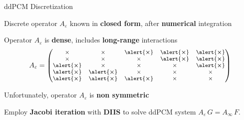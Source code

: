 \begin{frame}{ddPCM Discretization}
\begin{wideitemize}
\item Discrete operator $A_\varepsilon$ known in {\bf closed form}, after {\bf numerical} integration
\item Operator $A_\varepsilon$ is {\bf dense}, includes {\bf long-range} interactions
\[ A_\varepsilon =
{\footnotesize
\begin{pmatrix}
\times				& \times					& \alert{\boldsymbol{\times}}	& \alert{\boldsymbol{\times}} 	& \alert{\boldsymbol{\times}} \\
\times				& \times					& \times					& \alert{\boldsymbol{\times}} 	& \alert{\boldsymbol{\times}} \\
\alert{\boldsymbol{\times}}	& \times					& \times					& \times 					& \alert{\boldsymbol{\times}} \\
\alert{\boldsymbol{\times}}	& \alert{\boldsymbol{\times}}	& \times					& \times 					& \times \\
\alert{\boldsymbol{\times}}	& \alert{\boldsymbol{\times}}	& \alert{\boldsymbol{\times}}	& \times 					& \times 
\end{pmatrix}
}  \displaybump
\]
\item Unfortunately, operator $A_\varepsilon$ is {\bf non symmetric}
\item Employ {\bf Jacobi iteration} with {\bf DIIS} to solve ddPCM system $A_\varepsilon \, G = A_\infty \, F$.
\end{wideitemize}


\end{frame}


